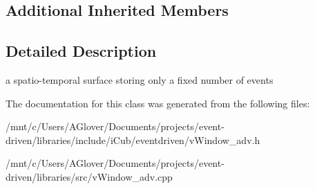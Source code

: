 \subsection*{Additional Inherited Members}


\subsection{Detailed Description}
a spatio-\/temporal surface storing only a fixed number of events 

The documentation for this class was generated from the following files\+:\begin{DoxyCompactItemize}
\item 
/mnt/c/\+Users/\+A\+Glover/\+Documents/projects/event-\/driven/libraries/include/i\+Cub/eventdriven/v\+Window\+\_\+adv.\+h\item 
/mnt/c/\+Users/\+A\+Glover/\+Documents/projects/event-\/driven/libraries/src/v\+Window\+\_\+adv.\+cpp\end{DoxyCompactItemize}
